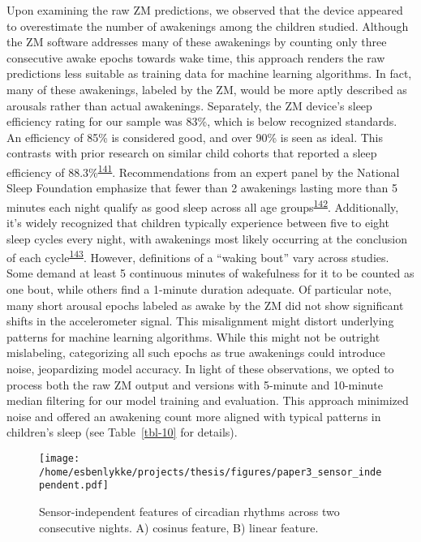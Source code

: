 \documentclass[
  10pt,
]{scrbook}
\begin{document}
Upon examining the raw ZM predictions, we observed that the device
appeared to overestimate the number of awakenings among the children
studied. Although the ZM software addresses many of these awakenings by
counting only three consecutive awake epochs towards wake time, this
approach renders the raw predictions less suitable as training data for
machine learning algorithms. In fact, many of these awakenings, labeled
by the ZM, would be more aptly described as arousals rather than actual
awakenings. Separately, the ZM device's sleep efficiency rating for our
sample was 83\%, which is below recognized standards. An efficiency of
85\% is considered good, and over 90\% is seen as ideal. This contrasts
with prior research on similar child cohorts that reported a sleep
efficiency of
88.3\%\textsuperscript{\protect\hyperlink{ref-galland_2018}{141}}.
Recommendations from an expert panel by the National Sleep Foundation
emphasize that fewer than 2 awakenings lasting more than 5 minutes each
night qualify as good sleep across all age
groups\textsuperscript{\protect\hyperlink{ref-ohayon_2017}{142}}.
Additionally, it's widely recognized that children typically experience
between five to eight sleep cycles every night, with awakenings most
likely occurring at the conclusion of each
cycle\textsuperscript{\protect\hyperlink{ref-galland_normal_2012}{143}}.
However, definitions of a ``waking bout'' vary across studies. Some
demand at least 5 continuous minutes of wakefulness for it to be counted
as one bout, while others find a 1-minute duration adequate. Of
particular note, many short arousal epochs labeled as awake by the ZM
did not show significant shifts in the accelerometer signal. This
misalignment might distort underlying patterns for machine learning
algorithms. While this might not be outright mislabeling, categorizing
all such epochs as true awakenings could introduce noise, jeopardizing
model accuracy. In light of these observations, we opted to process both
the raw ZM output and versions with 5-minute and 10-minute median
filtering for our model training and evaluation. This approach minimized
noise and offered an awakening count more aligned with typical patterns
in children's sleep (see Table~\ref{tbl-10} for details).

\begin{figure}

{\centering \texttt{[image: /home/esbenlykke/projects/thesis/figures/paper3\_sensor\_independent.pdf]}

}

\caption{\label{fig-paper3_sensor_independent}Sensor-independent
features of circadian rhythms across two consecutive nights. A) cosinus
feature, B) linear feature.}

\end{figure}
\end{document}
